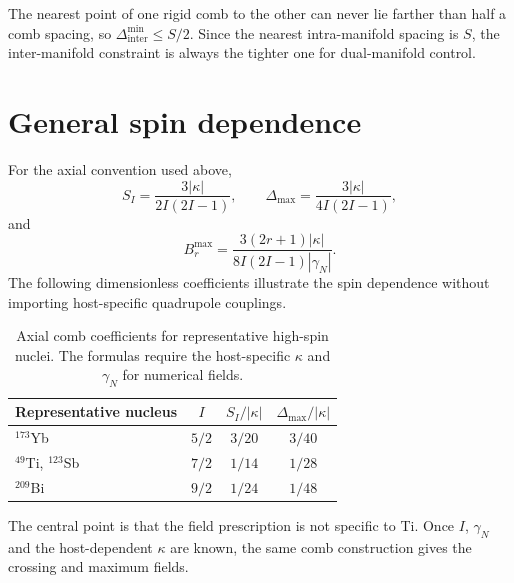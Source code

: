 \documentclass[11pt]{article}
\newcommand{\DeltaInter}{\Delta_{\mathrm{inter}}^{\min}}
\begin{document}
The nearest point of one rigid comb to the other can never lie farther than half a comb spacing, so $\DeltaInter\leq S/2$. Since the nearest intra-manifold spacing is $S$, the inter-manifold constraint is always the tighter one for dual-manifold control.

\section{General spin dependence}
For the axial convention used above,
\begin{equation}
S_I=\frac{3|\kappa|}{2I(2I-1)},\qquad
\Delta_{\max}=\frac{3|\kappa|}{4I(2I-1)},
\end{equation}
and
\begin{equation}
B_r^{\max}=\frac{3(2r+1)|\kappa|}{8I(2I-1)|\gamma_N|}.
\end{equation}
The following dimensionless coefficients illustrate the spin dependence without importing host-specific quadrupole couplings.
\begin{table}[h]
\centering
\caption{Axial comb coefficients for representative high-spin nuclei. The formulas require the host-specific $\kappa$ and $\gamma_N$ for numerical fields.}
\begin{tabular}{lccc}
\toprule
Representative nucleus & $I$ & $S_I/|\kappa|$ & $\Delta_{\max}/|\kappa|$\\
\midrule
$^{173}$Yb & $5/2$ & $3/20$ & $3/40$\\
$^{49}$Ti, $^{123}$Sb & $7/2$ & $1/14$ & $1/28$\\
$^{209}$Bi & $9/2$ & $1/24$ & $1/48$\\
\bottomrule
\end{tabular}
\end{table}
The central point is that the field prescription is not specific to Ti. Once $I$, $\gamma_N$ and the host-dependent $\kappa$ are known, the same comb construction gives the crossing and maximum fields.
\end{document}

